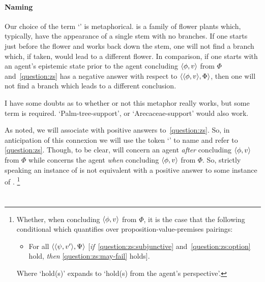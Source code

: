 \paragraph{Naming}

\begin{note}[Naming]
  Our choice of the term `' is metaphorical.
   is a family of flower plants which, typically, have the appearance of a single stem with no branches.
  If one starts just before the flower and works back down the stem, one will not find a branch which, if taken, would lead to a different flower.
  In comparison, if one starts with an agent's epistemic state prior to the agent concluding \(\langle \phi, v \rangle\) from \(\Phi\) and~\autoref{question:zs} has a negative answer with respect to \(\langle \langle \phi, v \rangle, \Phi \rangle\), then one will not find a branch which leads to a different conclusion.

  I have some doubts as to whether or not this metaphor really works, but some term is required.
  `Palm-tree-support', or `Arecaceae-support' would also work.
\end{note}

\begin{note}
  As {\color{red} noted}, we {\color{red} will} associate \zS{} with positive answers to~\autoref{question:zs}.
  So, in anticipation of this connexion we will use the token `\qzS{}' to name and refer to \autoref{question:zs}.
  Though, to be clear, \zS{} will concern an agent \emph{after} concluding \(\langle \phi, v \rangle\) from \(\Phi\) while \qzS{} concerns the agent \emph{when} concluding \(\langle \phi, v \rangle\) from \(\Phi\).
  So, strictly speaking an instance of \zS{} is not equivalent with a positive answer to some instance of \qzS{}.%
  \footnote{
    Whether, when concluding \(\langle \phi, v \rangle\) from \(\Phi\), it is the case that the following conditional which quantifies over proposition-value-premises pairings:

    \begin{itemize}
    \item
      For all \(\langle \langle \psi, v' \rangle, \Psi \rangle\) [\emph{if}~\ref{question:zs:subjunctive} and~\ref{question:zs:option} hold, \emph{then} \ref{question:zs:may-fail} holds].
    \end{itemize}
    Where `hold(s)' expands to `hold(s) from the agent's perspective'.
  }
\end{note}

\section{\zS{}}
\label{cha:zS:sec:question}

